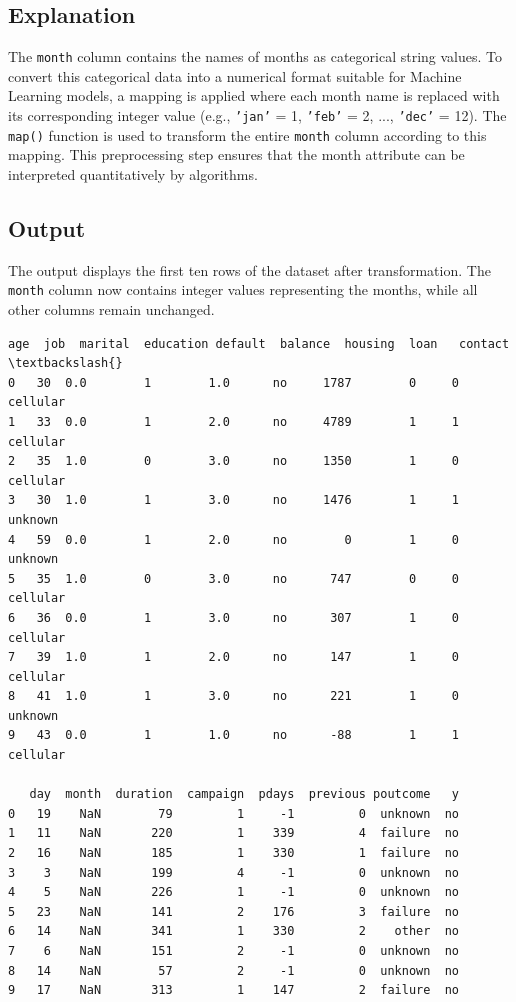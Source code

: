 \documentclass[11pt]{article}
\makeatletter
\newcommand{\boxspacing}{\kern\kvtcb@left@rule\kern\kvtcb@boxsep}
\newcommand{\prompt}[4]{
        {\ttfamily\llap{{\color{#2}[#3]:\hspace{3pt}#4}}\vspace{-\baselineskip}}
    }
\makeatother
\begin{document}
\subsection*{Explanation}
The \texttt{month} column contains the names of months as categorical string values. To convert this categorical data into a numerical format suitable for Machine Learning models, a mapping is applied where each month name is replaced with its corresponding integer value (e.g., \texttt{'jan'} = 1, \texttt{'feb'} = 2, ..., \texttt{'dec'} = 12). The \texttt{map()} function is used to transform the entire \texttt{month} column according to this mapping. This preprocessing step ensures that the month attribute can be interpreted quantitatively by algorithms.

\subsection*{Output}
The output displays the first ten rows of the dataset after transformation. The \texttt{month} column now contains integer values representing the months, while all other columns remain unchanged.
            \begin{tcolorbox}[breakable, size=fbox, boxrule=.5pt, pad at break*=1mm, opacityfill=0]
\prompt{Out}{outcolor}{11}{\boxspacing}
\begin{Verbatim}[commandchars=\\\{\}]
   age  job  marital  education default  balance  housing  loan   contact  \textbackslash{}
0   30  0.0        1        1.0      no     1787        0     0  cellular
1   33  0.0        1        2.0      no     4789        1     1  cellular
2   35  1.0        0        3.0      no     1350        1     0  cellular
3   30  1.0        1        3.0      no     1476        1     1   unknown
4   59  0.0        1        2.0      no        0        1     0   unknown
5   35  1.0        0        3.0      no      747        0     0  cellular
6   36  0.0        1        3.0      no      307        1     0  cellular
7   39  1.0        1        2.0      no      147        1     0  cellular
8   41  1.0        1        3.0      no      221        1     0   unknown
9   43  0.0        1        1.0      no      -88        1     1  cellular

   day  month  duration  campaign  pdays  previous poutcome   y
0   19    NaN        79         1     -1         0  unknown  no
1   11    NaN       220         1    339         4  failure  no
2   16    NaN       185         1    330         1  failure  no
3    3    NaN       199         4     -1         0  unknown  no
4    5    NaN       226         1     -1         0  unknown  no
5   23    NaN       141         2    176         3  failure  no
6   14    NaN       341         1    330         2    other  no
7    6    NaN       151         2     -1         0  unknown  no
8   14    NaN        57         2     -1         0  unknown  no
9   17    NaN       313         1    147         2  failure  no
\end{Verbatim}
\end{tcolorbox}
        
\end{document}
